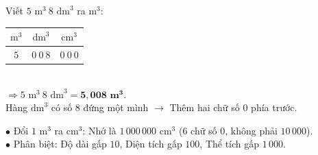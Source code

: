 \documentclass[14pt,a4paper,oneside]{extbook}
\begin{document}
\vspace{3mm}

\noindent
\begin{minipage}[t]{0.54\textwidth}
  \begin{tcolorbox}[
    enhanced,
    title={\footnotesize\bfseries\color{white}\faBolt\ Phương pháp 3 chữ số mỗi hàng},
    colback=green!3!white,
    colframe=green!60!black,
    arc=2.5mm, boxrule=0.8pt, top=1.8mm, bottom=1.8mm, left=2.2mm, right=2.2mm
  ]
    \footnotesize
    Viết $5\text{ m}^3\ 8\text{ dm}^3$ ra $\text{m}^3$:\\
    \centering
    \begin{tabular}{|c|c|c|}
      \hline
      $\text{m}^3$ & $\text{dm}^3$ & $\text{cm}^3$ \\ \hline
      $5$ & $0\ 0\ 8$ & $0\ 0\ 0$ \\ \hline
    \end{tabular}\\[2pt]
    $\Rightarrow 5\text{ m}^3\ 8\text{ dm}^3 = \mathbf{5,008\text{ m}^3}$.\\
    Hàng $\text{dm}^3$ có số $8$ đứng một mình $\rightarrow$ Thêm hai chữ số $0$ phía trước.
  \end{tcolorbox}
\end{minipage}%
\hfill
\begin{minipage}[t]{0.44\textwidth}
  \begin{tcolorbox}[
    enhanced,
    title={\footnotesize\bfseries\color{white}\faExclamationTriangle\ Mẹo tránh bẫy trắc nghiệm},
    colback=red!2!white,
    colframe=red!70!black,
    arc=2.5mm, boxrule=0.8pt, top=1.8mm, bottom=1.8mm, left=2.2mm, right=2.2mm
  ]
    \footnotesize
    $\bullet$ Đổi $1\text{ m}^3$ ra $\text{cm}^3$: Nhớ là \textbf{$1\,000\,000\text{ cm}^3$} ($6$ chữ số $0$, không phải $10\,000$).\\
    $\bullet$ Phân biệt: Độ dài gấp $10$, Diện tích gấp $100$, Thể tích gấp $1\,000$.
  \end{tcolorbox}
\end{minipage}
\end{document}
